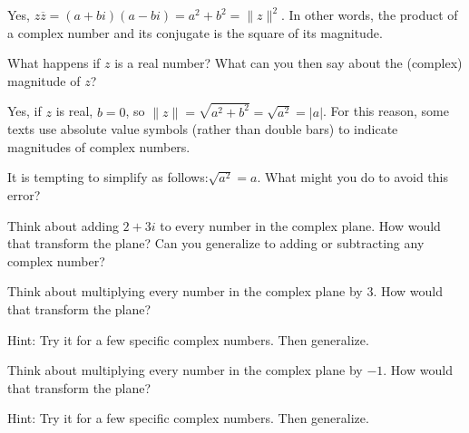 \documentclass{ximera}
\begin{document}
\begin{question}
Yes, $z\overline{z}=\left(a+bi\right)\left(a-bi\right)=a^{2}+b^{2}=\|z\| ^{2}$.  In other words, the product of a complex number and its conjugate is the square of its magnitude.  

What happens if $z$ is a real number?  What can you then say about the (complex) magnitude of $z$?  
\begin{freeResponse}
\end{freeResponse}

\end{question}

\begin{question}
Yes, if $z$ is real, $b=0$, so $\|z\| =\sqrt{a^{2}+b^{2}}=\sqrt{a^{2}}=\left|a\right|$.  For this reason, some texts use absolute value symbols (rather than double bars) to indicate magnitudes of complex numbers.  

It is tempting to simplify as follows:$\sqrt{a^{2}}=a$.  What might you do to avoid this error? 
\begin{freeResponse}
\end{freeResponse}

\end{question}

\begin{question}
Think about adding $2+3i$ to every number in the complex plane.  How would that transform the plane?  Can you generalize to adding or subtracting any complex number? 
\begin{freeResponse}
\end{freeResponse}
 
\end{question}

\begin{question}
Think about multiplying every number in the complex plane by 3.  How would that transform the plane?  

Hint: Try it for a few specific complex numbers.  Then generalize.  

\begin{freeResponse}
\end{freeResponse}

\end{question}

\begin{question}
Think about multiplying every number in the complex plane by $-1$.  How would that transform the plane?  

Hint: Try it for a few specific complex numbers.  Then generalize.  
\begin{freeResponse}
\end{freeResponse}

\end{question}
\end{document}
